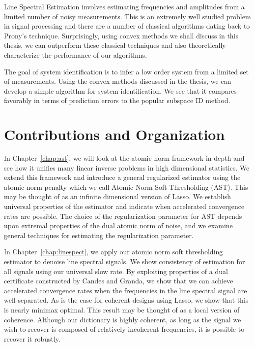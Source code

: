 Line Spectral Estimation involves estimating frequencies and amplitudes from a
limited number of noisy measurements. This is an extremely well studied problem
in signal processing and there are a number of classical algorithms dating back
to Prony's technique. Surprisingly, using convex methods we shall discuss in
this thesis, we can outperform these classical techniques and also theoretically
characterize the performance of our algorithms.

The goal of system identification is to infer a low order system from a limited set of measurements. Using the convex methods discussed in the thesis, we can develop a simple algorithm for system identification. We see that it compares favorably in terms of prediction errors to the popular subspace ID method.
 

\section{Contributions and Organization} %
\label{sec:contributions}

In Chapter~\ref{chap:ast}, we will look at the atomic norm framework in depth
and see how it unifies many linear inverse problems in high dimensional
statistics. We extend this framework and introduce a general regularized estimator using the atomic norm penalty which we call Atomic Norm Soft Thresholding (AST). This may be thought of as an infinite dimensional version of Lasso. We establish universal properties of the estimator and indicate when accelerated convergence rates are possible. The choice of the regularization parameter for AST depends upon extremal properties of the dual atomic norm of noise, and we examine general techniques for estimating the regularization parameter.

In Chapter~\ref{chap:linespect}, we apply our atomic norm soft thresholding
estimator to denoise line spectral signals. We show consistency of estimation
for all signals using our universal slow rate. By exploiting properties of a
dual certificate constructed by Candes and Granda, we show that we can achieve
accelerated convergence rates when the frequencies in the line spectral signal
are well separated. As is the case for coherent designs using Lasso, we show
that this is nearly minimax optimal. This result may be thought of as a local
version of coherence. Although our dictionary is highly coherent, as long as the
signal we wish to recover is composed of relatively incoherent frequencies, it
is possible to recover it robustly. 

